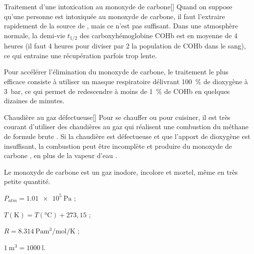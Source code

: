 
\begin{doc}{Traitement d'une intoxication au monoxyde de carbone}[\label{doc:traitement_intoxication}]
  Quand on suppose qu'une personne est intoxiquée au monoxyde de carbone, il faut l'extraire rapidement de la source de , mais ce n'est pas suffisant.
  Dans une atmosphère normale, la demi-vie $t_{1/2}$ des carboxyhémoglobine COHb est en moyenne de 4 heures (il faut 4 heures pour diviser par 2 la population de COHb dans le sang), ce qui entraine une récupération parfois trop lente.
  
  Pour accélérer l'élimination du monoxyde de carbone, le traitement le plus efficace consiste à utiliser un masque respiratoire délivrant \qty{100}{\percent} de dioxygène à \qty{3}{\bar}, ce qui permet de redescendre à moins de \qty{1}{\percent} de COHb en quelques dizaines de minutes.
\end{doc}



\begin{doc}{Chaudière au gaz défectueuse}[\label{doc:chaudiere_combustion}]
  Pour se chauffer ou pour cuisiner, il est très courant d'utiliser des chaudières au gaz qui réalisent une combustion du méthane de formule brute .
  Si la chaudière est défectueuse et que l'apport de dioxygène est insuffisant, la combustion peut être incomplète et produire du monoxyde de carbone , en plus de la vapeur d'eau .

  Le monoxyde de carbone est un gaz inodore, incolore et mortel, même en très petite quantité.

  \begin{donnees}[2]
    \item $P_{atm} = \qty{1,01e5}{\pascal}$ ;
    \item $T (\unit{\kelvin}) = T(\unit{\degreeCelsius}) + 273,15$ ;
    \item $R = \qty{8.314}{\pascal\m\cubed\per\mol\per\kelvin}$ ;
    \item $\qty{1}{\m\cubed} = \qty{1000}{\litre}$.
  \end{donnees}
\end{doc}

